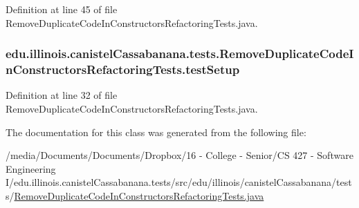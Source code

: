 Definition at line 45 of file RemoveDuplicateCodeInConstructorsRefactoringTests.java.

\hypertarget{classedu_1_1illinois_1_1canistelCassabanana_1_1tests_1_1RemoveDuplicateCodeInConstructorsRefactoringTests_a59cc4d65c71cfb08779284c46cb56d3e}{
\subsubsection[{testSetup}]{ {\bf edu.illinois.canistelCassabanana.tests.RemoveDuplicateCodeInConstructorsRefactoringTests.testSetup}}}
\label{classedu_1_1illinois_1_1canistelCassabanana_1_1tests_1_1RemoveDuplicateCodeInConstructorsRefactoringTests_a59cc4d65c71cfb08779284c46cb56d3e}


Definition at line 32 of file RemoveDuplicateCodeInConstructorsRefactoringTests.java.



The documentation for this class was generated from the following file:\begin{DoxyCompactItemize}
\item 
/media/Documents/Documents/Dropbox/16 -\/ College -\/ Senior/CS 427 -\/ Software Engineering I/edu.illinois.canistelCassabanana.tests/src/edu/illinois/canistelCassabanana/tests/\hyperlink{RemoveDuplicateCodeInConstructorsRefactoringTests_8java}{RemoveDuplicateCodeInConstructorsRefactoringTests.java}\end{DoxyCompactItemize}
